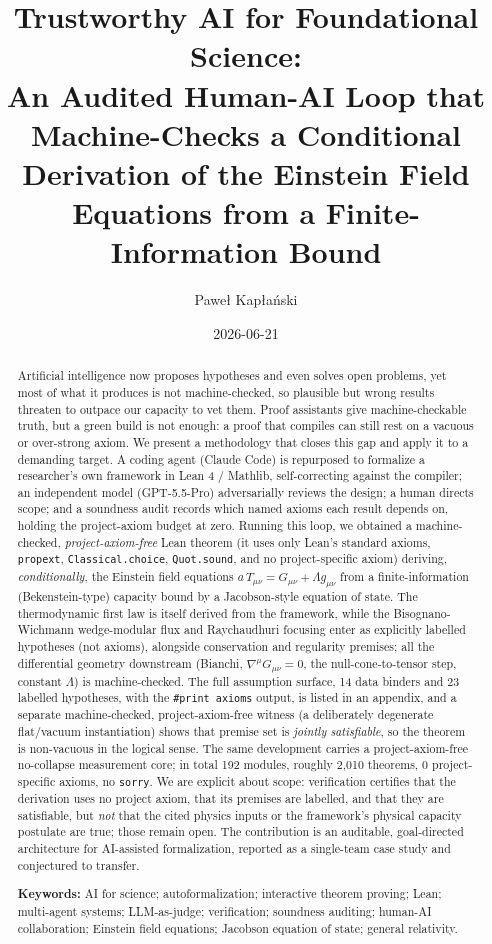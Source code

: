 \documentclass[11pt]{article}
\title{Trustworthy AI for Foundational Science:\\
An Audited Human-AI Loop that Machine-Checks a Conditional Derivation of the Einstein Field Equations from a Finite-Information Bound}
\author{Paweł Kapłański}
\date{2026-06-21}
\begin{document}
\maketitle

\begin{abstract}
\noindent
Artificial intelligence now proposes hypotheses and even solves open problems, yet most of what
it produces is not machine-checked, so plausible but wrong results threaten to outpace our
capacity to vet them. Proof assistants give machine-checkable truth, but a green build is not
enough: a proof that compiles can still rest on a vacuous or over-strong axiom. We present a
methodology that closes this gap and apply it to a demanding target. A coding agent (Claude Code) is
repurposed to formalize a researcher's own framework in Lean 4 / Mathlib, self-correcting against
the compiler; an independent model (GPT-5.5-Pro) adversarially reviews the design; a human directs
scope; and a soundness audit records which named axioms each result depends on, holding the
project-axiom budget at zero. Running this loop, we obtained a machine-checked, \emph{project-axiom-free}
Lean theorem (it uses only Lean's standard axioms, \texttt{propext}, \texttt{Classical.choice}, \texttt{Quot.sound},
and no project-specific axiom) deriving, \emph{conditionally}, the Einstein field equations
$a\,T_{\mu\nu}=G_{\mu\nu}+\Lambda g_{\mu\nu}$ from a finite-information (Bekenstein-type) capacity
bound by a Jacobson-style equation of state. The thermodynamic first law is itself derived from the
framework, while the Bisognano-Wichmann wedge-modular flux and Raychaudhuri focusing enter as
explicitly labelled hypotheses (not axioms), alongside conservation and regularity premises; all the
differential geometry downstream (Bianchi, $\nabla^\mu G_{\mu\nu}=0$, the null-cone-to-tensor step,
constant $\Lambda$) is machine-checked. The full assumption surface, 14 data binders and 23
labelled hypotheses, with the \texttt{\#print axioms} output, is listed in an appendix, and a separate
machine-checked, project-axiom-free witness (a deliberately degenerate flat/vacuum instantiation)
shows that premise set is \emph{jointly satisfiable}, so the theorem is non-vacuous in the logical sense. The same development carries a
project-axiom-free no-collapse measurement core; in total 192 modules, roughly 2,010 theorems, 0
project-specific axioms, no \texttt{sorry}. We are explicit about scope: verification certifies that the
derivation uses no project axiom, that its premises are labelled, and that they are satisfiable, but
\emph{not} that the cited physics inputs or the framework's physical capacity postulate are true; those
remain open. The contribution is an auditable, goal-directed architecture for AI-assisted
formalization, reported as a single-team case study and conjectured to transfer.

\medskip
\noindent\textbf{Keywords:} AI for science; autoformalization; interactive theorem proving; Lean; multi-agent
systems; LLM-as-judge; verification; soundness auditing; human-AI collaboration; Einstein field
equations; Jacobson equation of state; general relativity.
\end{abstract}
\end{document}
